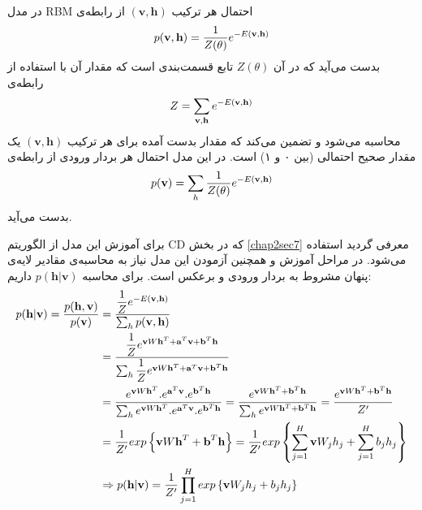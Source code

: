 در مدل
RBM
احتمال هر ترکیب
$(\textbf{v},\textbf{h})$
از رابطه‌ی
\begin{align}
	\centering
	\label{chap4-eq2}
	p(\textbf{v},\textbf{h}) = \dfrac{1}{Z(\theta)} e^{-E(\textbf{v},\textbf{h})}
\end{align}
بدست می‌‌آید که در آن
$Z(\theta)$
تابع قسمت‌بندی است که مقدار آن با استفاده از رابطه‌ی 
\begin{align}
	\centering
	\label{chap4-eq3}
	Z = \sum_{\textbf{v}, \textbf{h}}e^{-E(\textbf{v},\textbf{h})}
\end{align}
محاسبه می‌شود و تضمین می‌کند که مقدار بدست آمده برای هر ترکیب
$(\textbf{v},\textbf{h})$
یک مقدار صحیح احتمالی‌ (بین ۰ و ۱) است. در این مدل احتمال هر بردار ورودی از رابطه‌ی
\begin{align}
	\centering
	\label{chap4-eq4}
	p(\textbf{v}) = \sum_{h} \dfrac{1}{Z(\theta)} e^{-E(\textbf{v},\textbf{h})}
\end{align}
بدست می‌‌آید.

برای آموزش این مدل از الگوریتم
CD
که در بخش
\ref{chap2sec7}
معرفی‌ گردید استفاده می‌‌شود. در مراحل آموزش و همچنین آزمودن این مدل نیاز به محاسبه‌ی مقادیر لایه‌ی پنهان مشروط به بردار ورودی و برعکس است. برای محاسبه
$p(\textbf{h}|\textbf{v})$
داریم:
\begin{align}
	\centering
	\label{chap4-eq5}
	p(\textbf{h}|\textbf{v})=\dfrac{p(\textbf{h},\textbf{v})}{p(\textbf{v})} &=\dfrac{\dfrac{1}{Z}e^{-E(\textbf{v},\textbf{h})}}{\sum_{h}p(\textbf{v},\textbf{h})}\\\nonumber
								&=\dfrac{\dfrac{1}{Z}e^{\textbf{v}W\textbf{h}^{T}+\textbf{a}^{T}\textbf{v}+\textbf{b}^{T}\textbf{h}}}{\sum_{h}\dfrac{1}{Z}e^{\textbf{v}W\textbf{h}^{T}+\textbf{a}^{T}\textbf{v}+\textbf{b}^{T}\textbf{h}}}\\\nonumber
								&=\dfrac{e^{\textbf{v}W\textbf{h}^{T}}.e^{\textbf{a}^{T}\textbf{v}}.e^{\textbf{b}^{T}\textbf{h}}}{\sum_{h}e^{\textbf{v}W\textbf{h}^{T}}.e^{\textbf{a}^{T}\textbf{v}}.e^{\textbf{b}^{T}\textbf{h}}}
								=\dfrac{e^{\textbf{v}W\textbf{h}^{T}+\textbf{b}^{T}\textbf{h}}}{\sum_{h}e^{\textbf{v}W\textbf{h}^{T}+\textbf{b}^{T}\textbf{h}}}
								=\dfrac{e^{\textbf{v}W\textbf{h}^{T}+\textbf{b}^{T}\textbf{h}}}{Z'}\\\nonumber
								&=\dfrac{1}{Z'}exp\left\lbrace \textbf{v}W\textbf{h}^{T}+\textbf{b}^{T}\textbf{h}\right\rbrace
								=\dfrac{1}{Z'}exp \left\lbrace \sum_{j=1}^{H}\textbf{v}W_jh_j + \sum_{j=1}^{H}b_jh_j \right\rbrace\\\nonumber
								&\Rightarrow p(\textbf{h}|\textbf{v})=\dfrac{1}{Z'}\prod_{j=1}^{H}exp\left\lbrace \textbf{v}W_jh_j + b_jh_j \right\rbrace
\end{align}

